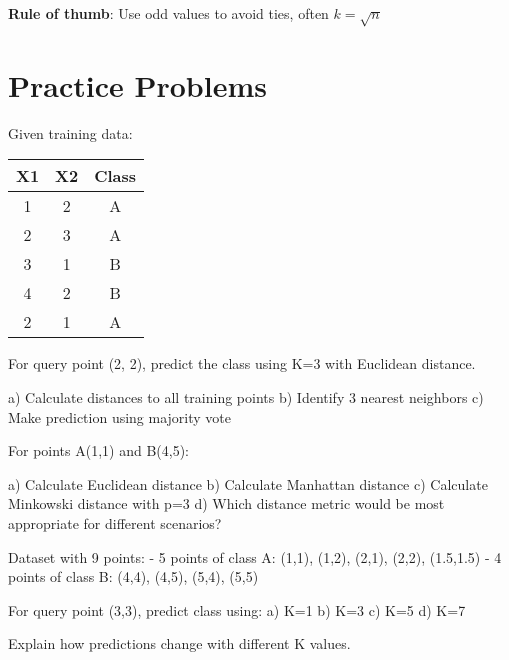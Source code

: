 \documentclass{article}
\newcounter{exercise}
\begin{document}
\textbf{Rule of thumb}: Use odd values to avoid ties, often $k = \sqrt{n}$

\section{Practice Problems}

\begin{tcolorbox}[colback=gray!5!white,colframe=gray!75!black,title=Problem \stepcounter{exercise}: Basic KNN Classification]

Given training data:
\begin{center}
\begin{tabular}{|c|c|c|}
\hline
X1 & X2 & Class \\
\hline
1 & 2 & A \\
2 & 3 & A \\
3 & 1 & B \\
4 & 2 & B \\
2 & 1 & A \\
\hline
\end{tabular}
\end{center}

For query point (2, 2), predict the class using K=3 with Euclidean distance.

a) Calculate distances to all training points
b) Identify 3 nearest neighbors
c) Make prediction using majority vote
\end{tcolorbox}

\begin{tcolorbox}[colback=gray!5!white,colframe=gray!75!black,title=Problem \stepcounter{exercise}: Distance Metrics Comparison]

For points A(1,1) and B(4,5):

a) Calculate Euclidean distance
b) Calculate Manhattan distance  
c) Calculate Minkowski distance with p=3
d) Which distance metric would be most appropriate for different scenarios?
\end{tcolorbox}

\begin{tcolorbox}[colback=gray!5!white,colframe=gray!75!black,title=Problem \stepcounter{exercise}: Effect of K Value]

Dataset with 9 points:
- 5 points of class A: (1,1), (1,2), (2,1), (2,2), (1.5,1.5)
- 4 points of class B: (4,4), (4,5), (5,4), (5,5)

For query point (3,3), predict class using:
a) K=1
b) K=3  
c) K=5
d) K=7

Explain how predictions change with different K values.
\end{tcolorbox}
\end{document}

